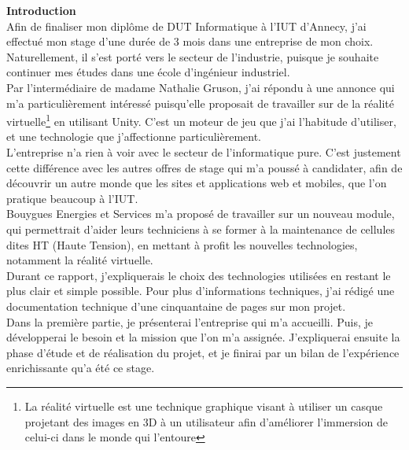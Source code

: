 \documentclass[a4paper]{article}
\begin{document}
    \newpage
    \setcounter{tocdepth}{2}
    \tableofcontents

    \newpage 
    \huge \textbf{Introduction} \vspace{20pt} \\
    \normalsize
    Afin de finaliser mon diplôme de DUT Informatique à l'IUT d'Annecy, j'ai effectué mon stage d'une durée de 3 mois dans une entreprise de mon choix. Naturellement, il s'est porté vers le secteur de l'industrie, puisque je souhaite continuer mes études dans une école d'ingénieur industriel. \\

    Par l'intermédiaire de madame Nathalie Gruson, j'ai répondu à une annonce qui m'a particulièrement intéressé puisqu'elle proposait de travailler sur de la réalité virtuelle\footnote{La réalité virtuelle est une technique graphique visant à utiliser un casque projetant des images en 3D à un utilisateur afin d'améliorer l'immersion de celui-ci dans le monde qui l'entoure} en utilisant Unity. C'est un moteur de jeu que j'ai l'habitude d'utiliser, et une technologie que j'affectionne particulièrement. \\

    L'entreprise n'a rien à voir avec le secteur de l'informatique pure. C'est justement cette différence avec les autres offres de stage qui m'a poussé à candidater, afin de découvrir un autre monde que les sites et applications web et mobiles, que l'on pratique beaucoup à l'IUT. \\
    
    Bouygues Energies et Services m'a proposé de travailler sur un nouveau module, qui permettrait d'aider leurs techniciens à se former à la maintenance de cellules dites HT (Haute Tension), en mettant à profit les nouvelles technologies, notamment la réalité virtuelle. \\

    Durant ce rapport, j'expliquerais le choix des technologies utilisées en restant le plus clair et simple possible. Pour plus d'informations techniques, j'ai rédigé une documentation technique d'une cinquantaine de pages sur mon projet. \\

    Dans la première partie, je présenterai l'entreprise qui m'a accueilli. Puis, je développerai le besoin et la mission que l'on m'a assignée. J'expliquerai ensuite la phase d'étude et de réalisation du projet, et je finirai par un bilan de l'expérience enrichissante qu'a été ce stage. \\
\end{document}

